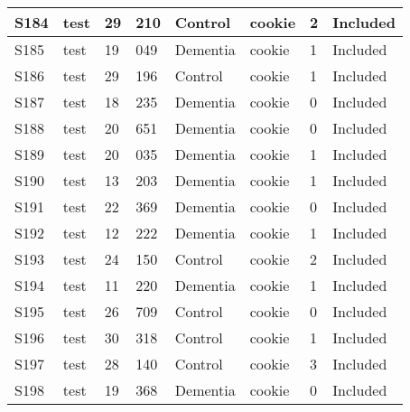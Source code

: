 \begin{center}
\begin{longtable}{|l|l|l|l|l|l|l|l|}
S184           & test                  & 29              & 210     & Control        & cookie          & 2            & Included      \\ \hline
S185           & test                  & 19              & 049     & Dementia       & cookie          & 1            & Included      \\ \hline
S186           & test                  & 29              & 196     & Control        & cookie          & 1            & Included      \\ \hline
S187           & test                  & 18              & 235     & Dementia       & cookie          & 0            & Included      \\ \hline
S188           & test                  & 20              & 651     & Dementia       & cookie          & 0            & Included      \\ \hline
S189           & test                  & 20              & 035     & Dementia       & cookie          & 1            & Included      \\ \hline
S190           & test                  & 13              & 203     & Dementia       & cookie          & 1            & Included      \\ \hline
S191           & test                  & 22              & 369     & Dementia       & cookie          & 0            & Included      \\ \hline
S192           & test                  & 12              & 222     & Dementia       & cookie          & 1            & Included      \\ \hline
S193           & test                  & 24              & 150     & Control        & cookie          & 2            & Included      \\ \hline
S194           & test                  & 11              & 220     & Dementia       & cookie          & 1            & Included      \\ \hline
S195           & test                  & 26              & 709     & Control        & cookie          & 0            & Included      \\ \hline
S196           & test                  & 30              & 318     & Control        & cookie          & 1            & Included      \\ \hline
S197           & test                  & 28              & 140     & Control        & cookie          & 3            & Included      \\ \hline
S198           & test                  & 19              & 368     & Dementia       & cookie          & 0            & Included      \\ \hline

\end{longtable}
\end{center}
